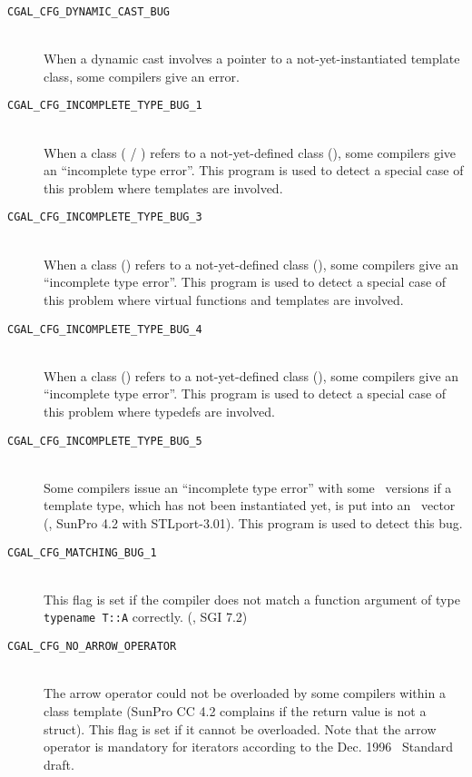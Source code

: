 \begin{description}
\item[{\tt CGAL\_CFG\_DYNAMIC\_CAST\_BUG}]~\\
 When a dynamic cast involves a pointer to a not-yet-instantiated 
 template class, some compilers give an error.

\item[{\tt CGAL\_CFG\_INCOMPLETE\_TYPE\_BUG\_1}]~\\
  When a class ( / ) refers to a not-yet-defined class
  (), some compilers give an ``incomplete type error''.  This
  program is used to detect a special case of this problem where
  templates are involved.

\item[{\tt CGAL\_CFG\_INCOMPLETE\_TYPE\_BUG\_3}]~\\
  When a class () refers to a not-yet-defined class (), some
  compilers give an ``incomplete type error''.  This program is used
  to detect a special case of this problem where virtual functions and
  templates are involved.

\item[{\tt CGAL\_CFG\_INCOMPLETE\_TYPE\_BUG\_4}]~\\
  When a class () refers to a not-yet-defined class (), some
  compilers give an ``incomplete type error''.  This program is used
  to detect a special case of this problem where typedefs are
  involved.

\item[{\tt CGAL\_CFG\_INCOMPLETE\_TYPE\_BUG\_5}]~\\
  Some compilers issue an ``incomplete type error'' with some \stl\
  versions if a template type, which has not been instantiated yet, is
  put into an \stl\ vector (\eg, SunPro 4.2 with STLport-3.01). This
  program is used to detect this bug.

\item[{\tt CGAL\_CFG\_MATCHING\_BUG\_1}]~\\
 This flag is set if the compiler does not match a function
 argument of type {\tt typename T::A} correctly.
 (\eg, SGI 7.2)

\item[{\tt CGAL\_CFG\_NO\_ARROW\_OPERATOR}]~\\
  The arrow operator  could not be overloaded by
  some compilers within a class template (SunPro CC 4.2 complains if
  the return value is not a struct). This flag is set
  if it cannot be overloaded. Note that the arrow operator is
  mandatory for iterators according to the Dec. 1996 \CC\ Standard
  draft.


\end{description}

